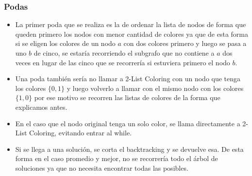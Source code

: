 


\subsubsection{Podas}

\begin{itemize}
	\item La primer poda que se realiza es la de ordenar la lista de nodos de forma que queden primero los nodos con menor cantidad de colores ya que de esta forma si se eligen los colores de un nodo $a$ con dos colores primero y luego se pasa a uno $b$ de cinco, se estaría recorriendo el subgrafo que no contiene a $a$ dos veces en lugar de las cinco que se recorrería si estuviera primero el nodo $b$.
	\item Una poda también sería no llamar a 2-List Coloring con un nodo que tenga los colores $\{0, 1\}$ y luego volverlo a llamar con el mismo nodo con los colores $\{1, 0\}$ por ese motivo se recorren las listas de colores de la forma que explicamos antes.
	\item En el caso que el nodo original tenga un solo color, se llama directamente a 2-List Coloring, evitando entrar al while.
	\item Si se llega a una solución, se corta el backtracking y se devuelve esa. De esta forma en el caso promedio y mejor, no se recorrería todo el árbol de soluciones ya que no necesita encontrar todas las posibles.
\end{itemize}



